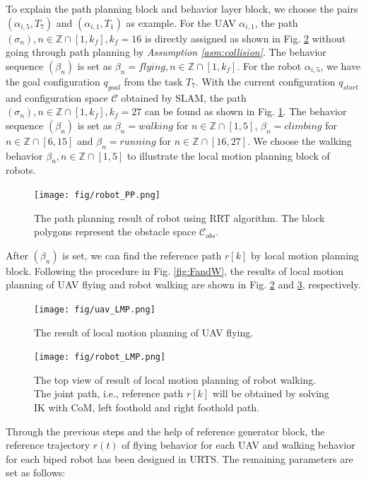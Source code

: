 \documentclass{ieeeaccess}
\begin{document}
To explain the path planning block and behavior layer block, we choose the pairs $(\alpha_{i,5},T_7)$ and $(\alpha_{i,1}, T_1)$ as example. For the UAV $\alpha_{i,1}$, the path $(\sigma_n),n\in\mathbb{Z}\cap[1,k_f],k_f=16$ is directly assigned as shown in Fig. \ref{sim:flying} without going through path planning by \textit{Assumption \ref{asm:collision}}. The behavior sequence $(\beta_n)$ is set as $\beta_n=\mathit{flying}, n\in\mathbb{Z}\cap[1,k_f]$. For the robot $\alpha_{i,5}$, we have the goal configuration $q_{goal}$ from the task $T_7$. With the current configuration $q_{start}$ and configuration space $\mathcal{C}$ obtained by SLAM, the path $(\sigma_n),n\in\mathbb{Z}\cap[1,k_f],k_f=27$ can be found as shown in Fig. \ref{fig:R_task}. The behavior sequence $(\beta_n)$ is set as $\beta_n=\mathit{walking}$ for $n\in\mathbb{Z}\cap[1,5]$, $\beta_n=\mathit{climbing}$ for $n\in\mathbb{Z}\cap[6,15]$ and $\beta_n=\mathit{running}$ for $n\in\mathbb{Z}\cap[16,27]$. We choose the walking behavior $\beta_n, n\in\mathbb{Z}\cap[1,5]$ to illustrate the local motion planning block of robots.
\begin{figure}[htbp]
    \centering
    \texttt{[image: fig/robot\_PP.png]}\caption{The path planning result of robot using RRT algorithm. The block polygons represent the obstacle space $\mathcal{C}_{obs}$.}%
    \label{fig:R_task}
\end{figure}

After $(\beta_n)$ is set, we can find the reference path $r[k]$ by local motion planning block. Following the procedure in Fig. \ref{fig:FandW}, the results of local motion planning of UAV flying and robot walking are shown in Fig. \ref{sim:flying} and \ref{sim:walking}, respectively.
\begin{figure}[htbp]
    \centering
    \texttt{[image: fig/uav\_LMP.png]}\caption{The result of local motion planning of UAV flying.}%
    \label{sim:flying}
\end{figure}
\begin{figure}[htbp]
    \centering
    \texttt{[image: fig/robot\_LMP.png]}\caption{The top view of result of local motion planning of robot walking. The joint path, i.e., reference path $r[k]$ will be obtained by solving IK with CoM, left foothold and right foothold path.}
    \label{sim:walking}
\end{figure}

Through the previous steps and the help of reference generator block, the reference trajectory $r(t)$ of flying behavior for each UAV and walking behavior for each biped robot has been designed in URTS. The remaining parameters are set as follows:
\end{document}
